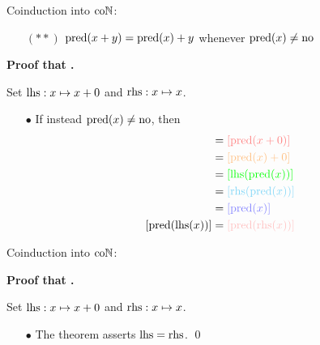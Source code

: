 \begin{frame}[t]{Coinduction into $\mathrm{co}\mathbb{N}$: \currentGoal} %
  \simpleCoindNBlock

  \begin{itemize}
    \item[$(**)$] {
      $\operatorname{pred}(x + y) = \operatorname{pred}(x) + y$ whenever $\operatorname{pred}(x) \neq \mathrm{no}$
    }
  \end{itemize}

  \vspace{0.5 \baselineskip}

  \par\textbf{Proof that \currentGoal.}
  \par Set $\mathrm{lhs} : x \mapsto x + 0$ and $\mathrm{rhs} : x \mapsto x$.
  \begin{itemize}[]
    \item[$\bullet$] {
      If instead $\operatorname{pred}(x) \neq \mathrm{no}$, then
      \begin{align*}
        [\pred(\lhs(x))]
        &= \textcolor{red!50!white}{[\pred(x + 0)]}
        \\
        &= \textcolor{orange!50!white}{[\pred(x) + 0]}
        \\
        &= \textcolor{green}{[\lhs(\pred(x))]}
        \\
        &= \textcolor{cyan!50!white}{[\rhs(\pred(x))]}
        \\
        &= \textcolor{blue!50!white}{[\pred(x)]}
        \\
        [\pred(\lhs(x))]
        &= \textcolor{pink}{[\pred(\rhs(x))]}
      \end{align*}
    }
  \end{itemize}
  
\end{frame}

\begin{frame}[t]{Coinduction into $\mathrm{co}\mathbb{N}$: \currentGoal} %
  \simpleCoindNBlock

  \par\textbf{Proof that \currentGoal.}
  \par Set $\mathrm{lhs} : x \mapsto x + 0$ and $\mathrm{rhs} : x \mapsto x$.
  \begin{itemize}
    \item[$\bullet$] {
      The theorem asserts $\mathrm{lhs} = \mathrm{rhs}$.
      \qed
    }
  \end{itemize}
  
\end{frame}
